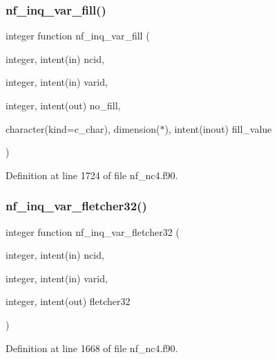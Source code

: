 \subsubsection{\texorpdfstring{nf\+\_\+inq\+\_\+var\+\_\+fill()}{nf\_inq\_var\_fill()}}
{\footnotesize\ttfamily integer function nf\+\_\+inq\+\_\+var\+\_\+fill (\begin{DoxyParamCaption}\item[{integer, intent(in)}]{ncid,  }\item[{integer, intent(in)}]{varid,  }\item[{integer, intent(out)}]{no\+\_\+fill,  }\item[{character(kind=c\+\_\+char), dimension($\ast$), intent(inout)}]{fill\+\_\+value }\end{DoxyParamCaption})}



Definition at line 1724 of file nf\+\_\+nc4.\+f90.

\mbox{\label{nf__nc4_8f90_ad55670c57d36c16ebc8507d55e680cd0}} 
\subsubsection{\texorpdfstring{nf\+\_\+inq\+\_\+var\+\_\+fletcher32()}{nf\_inq\_var\_fletcher32()}}
{\footnotesize\ttfamily integer function nf\+\_\+inq\+\_\+var\+\_\+fletcher32 (\begin{DoxyParamCaption}\item[{integer, intent(in)}]{ncid,  }\item[{integer, intent(in)}]{varid,  }\item[{integer, intent(out)}]{fletcher32 }\end{DoxyParamCaption})}



Definition at line 1668 of file nf\+\_\+nc4.\+f90.

\mbox{\label{nf__nc4_8f90_a288dac8c47f0c45192ea050536ab4760}} 
